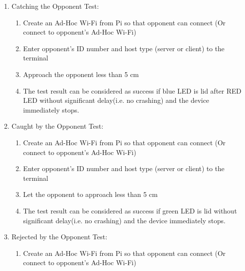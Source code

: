 \documentclass[a4paper,12pt]{article}
\begin{document}
\begin{enumerate}
	
	
	\item Catching the Opponent Test:
	
	
	\begin{enumerate}
		
		\item Create an Ad-Hoc Wi-Fi from Pi so that opponent can connect (Or connect to opponent's Ad-Hoc Wi-Fi)
		
		\item Enter opponent's ID number and host type (server or client) to the terminal
		
		\item Approach the opponent less than 5 cm
		
		\item The test result can be considered as success if blue LED is lid  after RED LED without significant delay(i.e. no crashing) and the device immediately stops.
		
	\end{enumerate}		
	
	
	\item Caught by the Opponent Test:
	
	
	\begin{enumerate}
		
		\item Create an Ad-Hoc Wi-Fi from Pi so that opponent can connect (Or connect to opponent's Ad-Hoc Wi-Fi)
		
		\item Enter opponent's ID number and host type (server or client) to the terminal
		
		\item Let the opponent to approach less than 5 cm
		
		\item The test result can be considered as success if green LED is lid without significant delay(i.e. no crashing) and the device immediately stops.
		
	\end{enumerate}	
	
	\item Rejected by the Opponent Test:
	
	
	\begin{enumerate}
		
		\item Create an Ad-Hoc Wi-Fi from Pi so that opponent can connect (Or connect to opponent's Ad-Hoc Wi-Fi)
		

\end{enumerate}
\end{enumerate}
\end{document}
